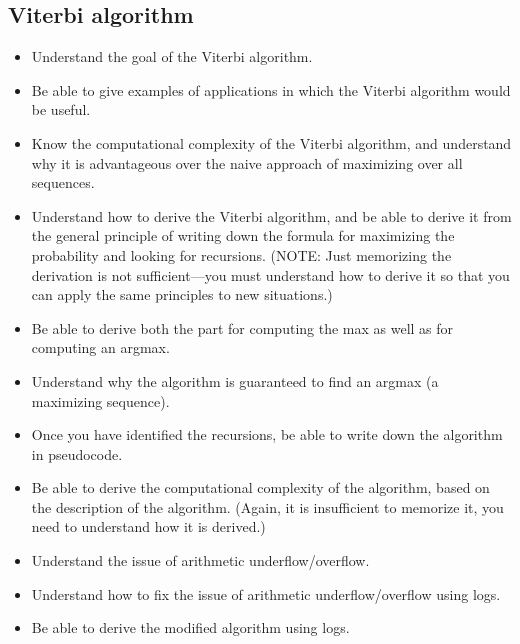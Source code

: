 \documentclass[12pt]{article}
\begin{document}
\subsection{Viterbi algorithm}
\begin{itemize}
\item Understand the goal of the Viterbi algorithm.
\item Be able to give examples of applications in which the Viterbi algorithm would be useful.
\item Know the computational complexity of the Viterbi algorithm, and understand why it is advantageous over the naive approach of maximizing over all sequences.
\item Understand how to derive the Viterbi algorithm, and be able to derive it  from the general principle of writing down the formula for maximizing the probability and looking for recursions. (NOTE: Just memorizing the derivation is not sufficient---you must understand how to derive it so that you can apply the same principles to new situations.)
\item Be able to derive both the part for computing the max as well as for computing an argmax.
\item Understand why the algorithm is guaranteed to find an argmax (a maximizing sequence).
\item Once you have identified the recursions, be able to write down the algorithm in pseudocode.
\item Be able to derive the computational complexity of the algorithm, based on the description of the algorithm. (Again, it is insufficient to memorize it, you need to understand how it is derived.)
\item Understand the issue of arithmetic underflow/overflow.
\item Understand how to fix the issue of arithmetic underflow/overflow using logs.
\item Be able to derive the modified algorithm using logs.
\end{itemize}
\end{document}
